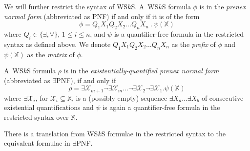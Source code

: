 We will further restrict the syntax of WS$k$S. A~WS$k$S formula $\phi$ is in the
\emph{prenex normal form} (abbreviated as PNF) if and only if it is of the form
\begin{equation}
\phi = Q_1X_1Q_2X_2\ldots Q_nX_n\ .\ \psi(\mathds{X})
\end{equation} where 
$Q_i \in \{\exists,\forall\}$, $1 \leq i \leq n$, and $\psi$ is a quantifier-free formula
in the restricted syntax as defined above. We denote $Q_1X_1Q_2X_2\ldots Q_nX_n$
as the \emph{prefix} of $\phi$ and $\psi(\mathds{X})$ as the \emph{matrix} of
$\phi$.
	
A~WS$k$S formula $\rho$ is in the \emph{existentially-quantified prenex normal
form} (abbreviated as $\exists$PNF), if and only if \begin{equation}\rho =
\exists \mathcal{X}_{m+1}\neg\exists \mathcal{X}_m\ldots\neg\exists
\mathcal{X}_2\neg\exists \mathcal{X}_1.\psi(\mathds{X})
\end{equation} where
$\exists\mathcal{X}_i$, for $\mathcal{X}_i \subseteq \mathds{X}$, is a (possibly
empty) sequence $\exists X_a\ldots\exists X_b$ of consecutive existential
quantifications and $\psi$ is again a quantifier-free formula in the restricted
syntax over $\mathds{X}$.
	
	\begin{prop}
There is a translation from WS$k$S formulae in the restricted syntax to the
equivalent formulae in $\exists$PNF.
	\end{prop}
	
